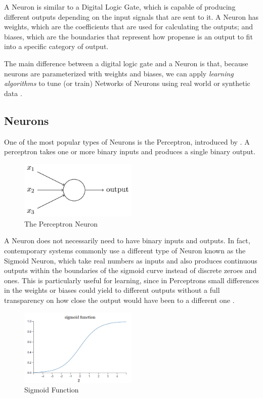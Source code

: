 \documentclass[openright]{normas-utf-tex} %
\begin{document}
A Neuron is similar to a Digital Logic Gate, which is capable of producing 
different outputs depending on the input signals that are sent to it.
A Neuron has weights, which are the coefficients that are used for calculating
the outputs; and biases, which are the boundaries that represent how propense is an output
to fit into a specific category of output. 

The main difference between a digital logic gate and a Neuron is that, because neurons are
parameterized with weights and biases, we can apply \textit{learning algorithms}
to tune (or train) Networks of Neurons using real world or synthetic data \cite{Nielsen2015}.

\subsection{Neurons}

One of the most popular types of Neurons is the Perceptron, introduced by 
\cite{Rosenblatt1958}. 
A perceptron takes one or more binary inputs and produces a single binary output.

\begin{figure}[H]
	\centering
	\includegraphics[width=0.5\textwidth]{./images/perceptron.png}
	\caption[The Perceptron Neuron]{The Perceptron Neuron}
	\label{fig:perceptron}
\end{figure}

A Neuron does not necessarily need to have binary inputs and outputs. In fact, 
contemporary systems commonly use a different type of Neuron known as the Sigmoid Neuron, 
which take real numbers as inputs and also produces continuous outputs 
within the boundaries of the sigmoid curve instead of discrete zeroes and ones. 
This is particularly useful for learning, since in Perceptrons small differences in the 
weights or biases could yield to different outputs without a full transparency 
on how close the output would have been to a different one \cite{Nielsen2015}.

\begin{figure}[H]
	\centering
	\includegraphics[width=0.5\textwidth]{./images/sigmoid-function.png}
	\caption[Sigmoid Function]{Sigmoid Function}
	\label{fig:sigmoid}
\end{figure}
\end{document}
